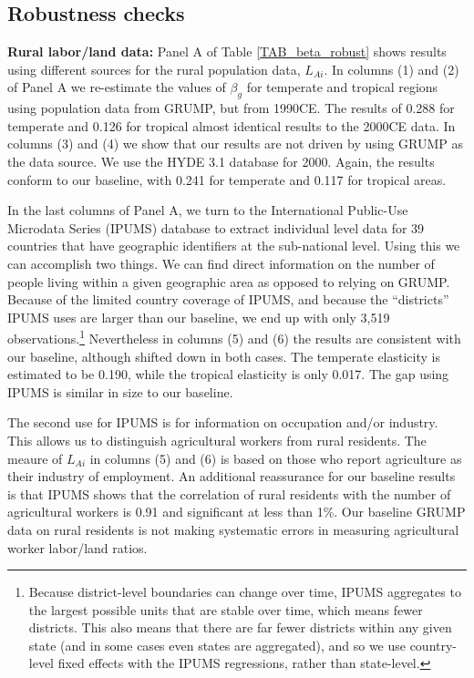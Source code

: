 \documentclass[12pt]{article}
\begin{document}
\subsection{Robustness checks}
\noindent\textbf{Rural labor/land data:} Panel A of Table \ref{TAB_beta_robust} shows results using different sources for the rural population data, $L_{Ai}$. In columns (1) and (2) of Panel A we re-estimate the values of $\beta_g$ for temperate and tropical regions using population data from GRUMP, but from 1990CE. The results of 0.288 for temperate and 0.126 for tropical almost identical results to the 2000CE data. In columns (3) and (4) we show that our results are not driven by using GRUMP as the data source. We use the HYDE 3.1 database \citep{hyde31} for 2000. Again, the results conform to our baseline, with 0.241 for temperate and 0.117 for tropical areas. 

In the last columns of Panel A, we turn to the International Public-Use Microdata Series (IPUMS) database \nocite{ipums} to extract individual level data for 39 countries that have geographic identifiers at the sub-national level. Using this we can accomplish two things. We can find direct information on the number of people living within a given geographic area as opposed to relying on GRUMP. Because of the limited country coverage of IPUMS, and because the ``districts'' IPUMS uses are larger than our baseline, we end up with only 3,519 observations.\footnote{Because district-level boundaries can change over time, IPUMS aggregates to the largest possible units that are stable over time, which means fewer districts. This also means that there are far fewer districts within any given state (and in some cases even states are aggregated), and so we use country-level fixed effects with the IPUMS regressions, rather than state-level.} Nevertheless in columns (5) and (6) the results are consistent with our baseline, although shifted down in both cases. The temperate elasticity is estimated to be 0.190, while the tropical elasticity is only 0.017. The gap using IPUMS is similar in size to our baseline.

The second use for IPUMS is for information on occupation and/or industry. This allows us to distinguish agricultural workers from rural residents. The meaure of $L_{Ai}$ in columns (5) and (6) is based on those who report agriculture as their industry of employment. An additional reassurance for our baseline results is that IPUMS shows that the correlation of rural residents with the number of agricultural workers is 0.91 and significant at less than 1\%. Our baseline GRUMP data on rural residents is not making systematic errors in measuring agricultural worker labor/land ratios.
\end{document}
